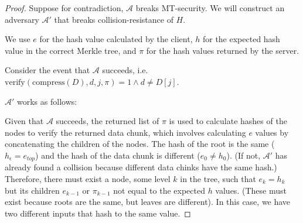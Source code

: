\begin{proof}
Suppose for contradiction, $\mathcal{A}$ breaks MT-security. We will construct an adversary $\mathcal{A}'$ that breaks collision-resistance of $H$.

\begin{center}
\end{center}

We use $e$ for the hash value calculated by the client, $h$ for the expected hash value in the correct Merkle tree, and $\pi$ for the hash values returned by the server.

Consider the event that $\mathcal{A}$ succeeds, i.e. $\mathrm{verify}(\mathrm{compress}(D), d, j, \pi) = 1 \land d \neq D[j]$.

$\mathcal{A}'$ works as follows:

Given that $\mathcal{A}$ succeeds, the returned list of $\pi$ is used to calculate hashes of the nodes to verify the returned data chunk, which involves calculating $e$ values by concatenating the children of the nodes. The hash of the root is the same ($h_\epsilon = e_{top}$)
and the hash of the data chunk is different ($e_0 \neq h_0$). (If not, $\mathcal{A}'$ has already found a collision because different data chinks have the same hash.)
Therefore, there must exist a node, some level $k$ in the tree, such that $e_k = h_k$ but its children $e_{k-1}$ or $\pi_{k-1}$ not equal to the expected $h$ values. (These must exist because roots are the same, but leaves are different). In this case, we have two different inputs that hash to the same value.


\end{proof}
